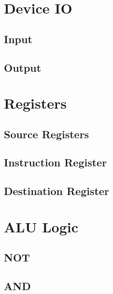 \documentclass[a4paper,11pt]{article}
\begin{document}
\section{Device IO}

\subsection{Input}

\subsection{Output}

\section{Registers}

\subsection{Source Registers}

\subsection{Instruction Register}

\subsection{Destination Register}

\section{ALU Logic}

\subsection{NOT}

\subsection{AND}
\end{document}
